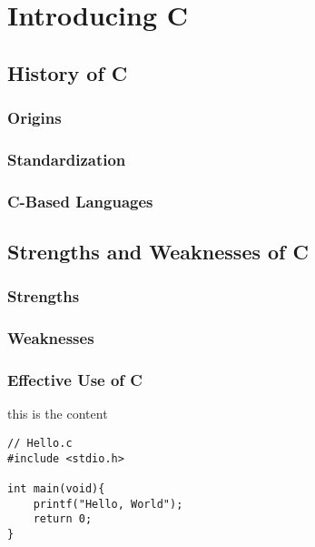 \documentclass[../main.tex]{subfiles}
\begin{document}
\section{Introducing C}

\subsection{History of C}
\subsubsection*{Origins}
\subsubsection*{Standardization}
\subsubsection*{C-Based Languages}


\subsection{Strengths and Weaknesses of C}
\subsubsection*{Strengths}
\subsubsection*{Weaknesses}
\subsubsection*{Effective Use of C}


this is the content

\begin{lstlisting}
// Hello.c
#include <stdio.h>

int main(void){
    printf("Hello, World");
    return 0;
}
\end{lstlisting}
\end{document}
